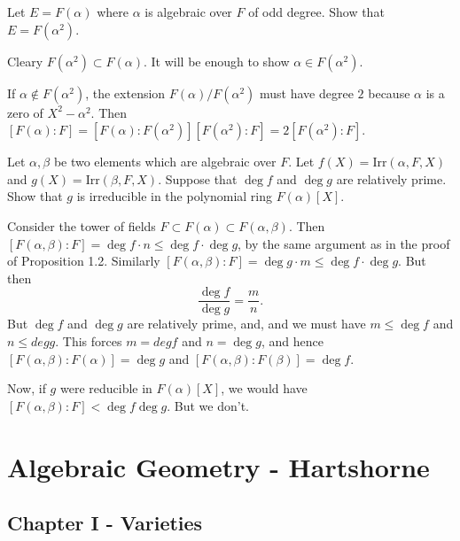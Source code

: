 \documentclass[11pt, english]{article}
\begin{document}
\begin{exc}
  Let $E=F(\alpha)$ where $\alpha$ is algebraic over $F$ of odd degree. Show that $E=F(\alpha^2)$.
\end{exc}
\begin{sol}
Cleary $F(\alpha^2) \subset F(\alpha)$. It will be enough to show $\alpha \in F(\alpha^2)$. 

If $\alpha \not \in F(\alpha^2)$, the extension $F(\alpha)/F(\alpha^2)$ must have degree $2$ because $\alpha$ is a zero of $X^2-\alpha^2$. Then $[F(\alpha):F]=[F(\alpha):F(\alpha^2)][F(\alpha^2):F]=2 [F(\alpha^2):F]$.
\end{sol}

\begin{exc}
 Let $\alpha, \beta$ be two elements which are algebraic over $F$. Let $f(X)=\mathrm{Irr}(\alpha,F,X)$ and $g(X)=\mathrm{Irr}(\beta,F,X)$. Suppose that $\deg f$ and $\deg g$ are relatively prime. Show that $g$ is irreducible in the polynomial ring $F(\alpha)[X]$.
\end{exc}

\begin{sol}
Consider the tower of fields $F \subset F(\alpha) \subset F(\alpha, \beta)$. Then $[F(\alpha,\beta):F] = \deg f \cdot n \leq \deg f \cdot \deg g$, by the same argument as in the proof of Proposition 1.2. Similarly $[F(\alpha,\beta):F]=\deg g \cdot m \leq \deg f \cdot \deg g$. But then
\[
\frac{\deg f}{\deg g} = \frac{m}{n}.
\]
But $\deg f$ and $\deg g$ are relatively prime, and, and we must have $m \leq \deg f$ and $n \leq deg g$. This forces $m = deg f$ and $n = \deg g$, and hence $[F(\alpha,\beta):F(\alpha)]=\deg g$ and $[F(\alpha,\beta):F(\beta)]=\deg f$.

Now, if $g$ were reducible in $F(\alpha)[X]$, we would have $[F(\alpha,\beta):F] < \deg f \deg g$. But we don't.
\end{sol}

\section{Algebraic Geometry - Hartshorne}

\subsection{Chapter I - Varieties}
\end{document}
